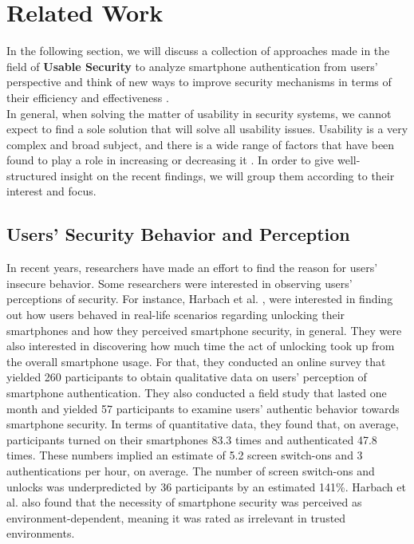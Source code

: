 \section{Related Work} \label{2.2}

In the following section, we will discuss a collection of approaches made in the field of \textbf{Usable Security} to analyze smartphone authentication from users' perspective and think of new ways to improve security mechanisms in terms of their efficiency and effectiveness \cite{anonymous}. \\

In general, when solving the matter of usability in security systems, we cannot expect to find a sole solution that will solve all usability issues. Usability is a very complex and broad subject, and there is a wide range of factors that have been found to play a role in increasing or decreasing it \cite{anonymous,harbach,Albayram:2017:BUL:3235924.3235929, AnatomySmartphone}. In order to give well-structured insight on the recent findings, we will group them according to their interest and focus.

\subsection{Users' Security Behavior and Perception} \label{2.2.1}

In recent years, researchers have made an effort to find the reason for users' insecure behavior. Some researchers were interested in observing users' perceptions of security. For instance, Harbach et al. \cite{harbach}, were interested in finding out how users behaved in real-life scenarios regarding unlocking their smartphones and how they perceived smartphone security, in general. They were also interested in discovering how much time the act of unlocking took up from the overall smartphone usage. For that, they conducted an online survey that yielded 260 participants to obtain qualitative data on users' perception of smartphone authentication. They also conducted a field study that lasted one month and yielded 57 participants to examine users' authentic behavior towards smartphone security. In terms of quantitative data, they found that, on average, participants turned on their smartphones 83.3 times and authenticated 47.8 times. These numbers implied an estimate of 5.2 screen switch-ons and 3 authentications per hour, on average. The number of screen switch-ons and unlocks was underpredicted by 36 participants by an estimated 141\%. Harbach et al. \cite{harbach} also found that the necessity of smartphone security was perceived as environment-dependent, meaning it was rated as irrelevant in trusted environments.\\

